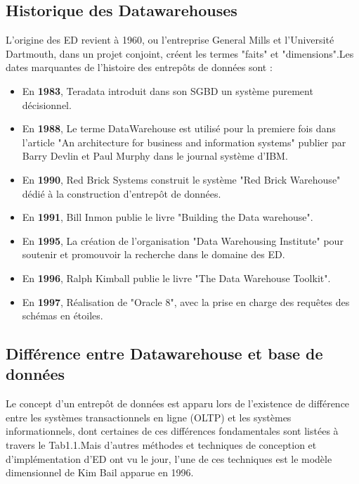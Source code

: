 \subsection{Historique des Datawarehouses}
L’origine des ED revient à 1960, ou l’entreprise General Mills et l’Université Dartmouth, dans un projet conjoint, créent les termes "faits" et "dimensions".Les dates marquantes de l’histoire des entrepôts de données sont : \cite{book:8}
\begin{itemize}
    \item En \textbf{1983}, Teradata introduit dans son SGBD un système purement décisionnel.
    \item En \textbf{1988}, Le terme DataWarehouse est utilisé pour la premiere fois dans l’article "An architecture for business and information systems" publier par Barry Devlin et Paul Murphy dans le journal système d’IBM.
    \item En \textbf{1990}, Red Brick Systems construit le système "Red Brick Warehouse" dédié à la construction d’entrepôt de données.
    \item En \textbf{1991}, Bill Inmon publie le livre "Building the Data warehouse".
    \item En \textbf{1995}, La création de l’organisation "Data Warehousing Institute" pour soutenir et promouvoir la recherche dans le domaine des ED.
    \item En \textbf{1996}, Ralph Kimball publie le livre "The Data Warehouse Toolkit".
    \item En \textbf{1997}, Réalisation de "Oracle 8", avec la prise en charge des requêtes des schémas
    en étoiles.
\end{itemize}


\subsection{Différence entre Datawarehouse et base de données}
Le concept d’un entrepôt de données est apparu lors de l’existence de différence entre les systèmes transactionnels en ligne (OLTP) et les systèmes informationnels, dont certaines de ces différences fondamentales sont listées à travers le Tab1.1.Mais d’autres méthodes et techniques de conception et d’implémentation d’ED ont vu le jour, l’une de ces techniques est le modèle dimensionnel de Kim Bail apparue en 1996. \cite{thesis:1}


